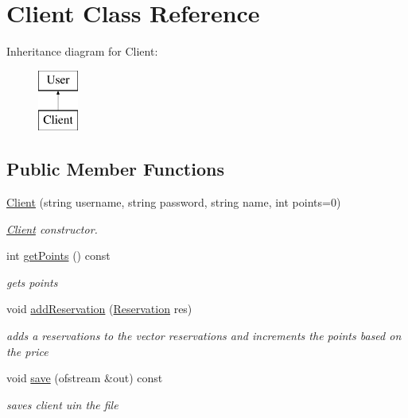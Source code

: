 \hypertarget{class_client}{}\section{Client Class Reference}
\label{class_client}
Inheritance diagram for Client\+:\begin{figure}[H]
\begin{center}
\leavevmode
\includegraphics[height=2.000000cm]{class_client}
\end{center}
\end{figure}
\subsection*{Public Member Functions}
\begin{DoxyCompactItemize}
\item 
\hyperlink{class_client_a94e6ab94b8ad2252cc26f3763ec0e253}{Client} (string username, string password, string name, int points=0)
\begin{DoxyCompactList}\small\item\em \hyperlink{class_client}{Client} constructor. \end{DoxyCompactList}\item 
int \hyperlink{class_client_aa3824f589da51dc537ccab1bcfcc8e85}{get\+Points} () const
\begin{DoxyCompactList}\small\item\em gets points \end{DoxyCompactList}\item 
void \hyperlink{class_client_a029f358b9ebb7afbf7ae30e076243b53}{add\+Reservation} (\hyperlink{class_reservation}{Reservation} res)
\begin{DoxyCompactList}\small\item\em adds a reservations to the vector reservations and increments the points based on the price \end{DoxyCompactList}\item 
void \hyperlink{class_client_a2a03ca4558efd182ea5d76dfcec24ecb}{save} (ofstream \&out) const
\begin{DoxyCompactList}\small\item\em saves client uin the file \end{DoxyCompactList}\end{DoxyCompactItemize}


